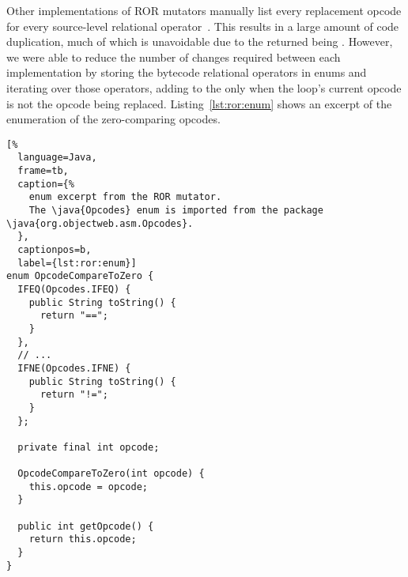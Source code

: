 Other implementations of ROR mutators manually list every replacement opcode for every source-level relational operator~\cite{ProdigyXable}.
This results in a large amount of code duplication, much of which is unavoidable due to the  returned being .
However, we were able to reduce the number of changes required between each implementation by storing the bytecode relational operators in enums and iterating over those operators, adding to the  only when the loop's current opcode is not the opcode being replaced.
Listing~\ref{lst:ror:enum} shows an excerpt of the enumeration of the zero-comparing opcodes.

\begin{lstlisting}[%
  language=Java,
  frame=tb,
  caption={%
    enum excerpt from the ROR mutator.
    The \java{Opcodes} enum is imported from the package \java{org.objectweb.asm.Opcodes}.
  },
  captionpos=b,
  label={lst:ror:enum}]
enum OpcodeCompareToZero {
  IFEQ(Opcodes.IFEQ) {
    public String toString() {
      return "==";
    }
  },
  // ...
  IFNE(Opcodes.IFNE) {
    public String toString() {
      return "!=";
    }
  };

  private final int opcode;

  OpcodeCompareToZero(int opcode) {
    this.opcode = opcode;
  }

  public int getOpcode() {
    return this.opcode;
  }
}
\end{lstlisting}
